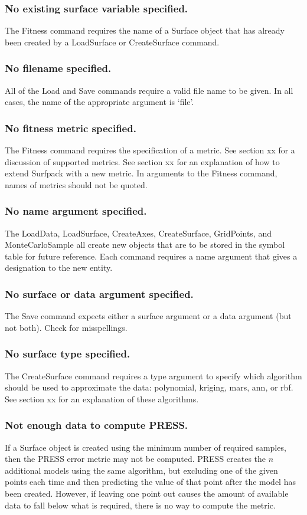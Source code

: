 \documentclass{article}
\begin{document}
\subsubsection{No existing surface variable specified.}
The Fitness command requires the name of a Surface object that has already been created by a LoadSurface or CreateSurface command.

\subsubsection{No filename specified.}
All of the Load and Save commands require a valid file name to be given.  In all cases, the name of the appropriate argument is `file'.

\subsubsection{No fitness metric specified.}
The Fitness command requires the specification of a metric.  See section xx for a discussion of supported metrics.  See section xx for an explanation of how to extend Surfpack with a new metric.  In arguments to the Fitness command, names of metrics should not be quoted.
\subsubsection{No name argument specified.}
The LoadData, LoadSurface, CreateAxes, CreateSurface, GridPoints, and MonteCarloSample all create new objects that are to be stored in the symbol table for future reference.  Each command requires a name argument that gives a designation to the new entity.

\subsubsection{No surface or data argument specified.}
The Save command expects either a surface argument or a data argument (but not both).  Check for misspellings.

\subsubsection{No surface type specified.}
The CreateSurface command requires a type argument to specify which algorithm should be used to approximate the data: polynomial, kriging, mars, ann, or rbf.  See section xx for an explanation of these algorithms.

\subsubsection{Not enough data to compute PRESS.}
If a Surface object is created using the minimum number of required samples, then the PRESS error metric may not be computed.  PRESS creates the $n$ additional models using the same algorithm, but excluding one of the given points each time and then predicting the value of that point after the model has been created.  However, if leaving one point out causes the amount of available data to fall below what is required, there is no way to compute the metric. 
\end{document}

